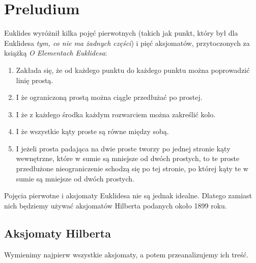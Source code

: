 \documentclass{parchment}
\begin{document}


\chapter{Preludium}

Euklides wyróżnił kilka pojęć pierwotnych (takich jak punkt, który był dla Euklidesa \emph{tym, co nie ma żadnych części}) i pięć aksjomatów, przytoczonych za książką \emph{O Elementach Euklidesa}:

\begin{enumerate}
	\item Zakłada się, że od każdego punktu do każdego punktu można poprowadzić linię prostą.
	\item I że ograniczoną prostą można ciągle przedłużać po prostej.
	\item I że z każdego środka każdym rozwarciem można zakreślić kolo.
	\item I że wszystkie kąty proste są równe między sobą.
	\item I jeżeli prosta padająca na dwie proste tworzy po jednej stronie kąty wewnętrzne, które w sumie są mniejsze od dwóch prostych, to te proste przedłużone nieograniczenie schodzą się po tej stronie, po której kąty te w sumie są mniejsze od dwóch prostych.
\end{enumerate}

Pojęcia pierwotne i aksjomaty Euklidesa nie są jednak idealne.
Dlatego zamiast nich będziemy używać aksjomatów Hilberta podanych około 1899 roku.

\section{Aksjomaty Hilberta}
Wymienimy najpierw wszystkie aksjomaty, a potem przeanalizujemy ich treść.
\end{document}
